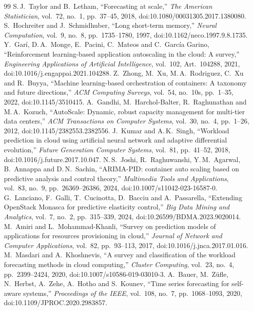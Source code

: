 \documentclass[conference,a4paper]{IEEEtran}
\begin{document}
\begin{thebibliography}{99}
 S.\,J.\ Taylor and B.\ Letham, ``Forecasting at scale,'' \textit{The American Statistician}, vol.~72, no.~1, pp.~37--45, 2018, doi:10.1080/00031305.2017.1380080.
 S.\ Hochreiter and J.\ Schmidhuber, ``Long short-term memory,'' \textit{Neural Computation}, vol.~9, no.~8, pp.~1735--1780, 1997, doi:10.1162/neco.1997.9.8.1735.
 Y.\ Gar\'i, D.\,A.\ Monge, E.\ Pacini, C.\ Mateos and C.\ Garc\'ia Garino, ``Reinforcement learning-based application autoscaling in the cloud: A survey,'' \textit{Engineering Applications of Artificial Intelligence}, vol.~102, Art.~104288, 2021, doi:10.1016/j.engappai.2021.104288.
 Z.\ Zhong, M.\ Xu, M.\,A.\ Rodriguez, C.\ Xu and R.\ Buyya, ``Machine learning-based orchestration of containers: A taxonomy and future directions,'' \textit{ACM Computing Surveys}, vol.~54, no.~10s, pp.~1--35, 2022, doi:10.1145/3510415.
 A.\ Gandhi, M.\ Harchol-Balter, R.\ Raghunathan and M.\,A.\ Kozuch, ``AutoScale: Dynamic, robust capacity management for multi-tier data centers,'' \textit{ACM Transactions on Computer Systems}, vol.~30, no.~4, pp.~1--26, 2012, doi:10.1145/2382553.2382556.
 J.\ Kumar and A.\,K.\ Singh, ``Workload prediction in cloud using artificial neural network and adaptive differential evolution,'' \textit{Future Generation Computer Systems}, vol.~81, pp.~41--52, 2018, doi:10.1016/j.future.2017.10.047.
 N.\,S.\ Joshi, R.\ Raghuwanshi, Y.\,M.\ Agarwal, B.\ Annappa and D.\,N.\ Sachin, ``ARIMA-PID: container auto scaling based on predictive analysis and control theory,'' \textit{Multimedia Tools and Applications}, vol.~83, no.~9, pp.~26369--26386, 2024, doi:10.1007/s11042-023-16587-0.
 G.\ Lanciano, F.\ Galli, T.\ Cucinotta, D.\ Bacciu and A.\ Passarella, ``Extending OpenStack Monasca for predictive elasticity control,'' \textit{Big Data Mining and Analytics}, vol.~7, no.~2, pp.~315--339, 2024, doi:10.26599/BDMA.2023.9020014.
 M.\ Amiri and L.\ Mohammad-Khanli, ``Survey on prediction models of applications for resources provisioning in cloud,'' \textit{Journal of Network and Computer Applications}, vol.~82, pp.~93--113, 2017, doi:10.1016/j.jnca.2017.01.016.
 M.\ Masdari and A.\ Khoshnevis, ``A survey and classification of the workload forecasting methods in cloud computing,'' \textit{Cluster Computing}, vol.~23, no.~4, pp.~2399--2424, 2020, doi:10.1007/s10586-019-03010-3.
 A.\ Bauer, M.\ Z\"ufle, N.\ Herbst, A.\ Zehe, A.\ Hotho and S.\ Kounev, ``Time series forecasting for self-aware systems,'' \textit{Proceedings of the IEEE}, vol.~108, no.~7, pp.~1068--1093, 2020, doi:10.1109/JPROC.2020.2983857.

\end{thebibliography}
\end{document}
